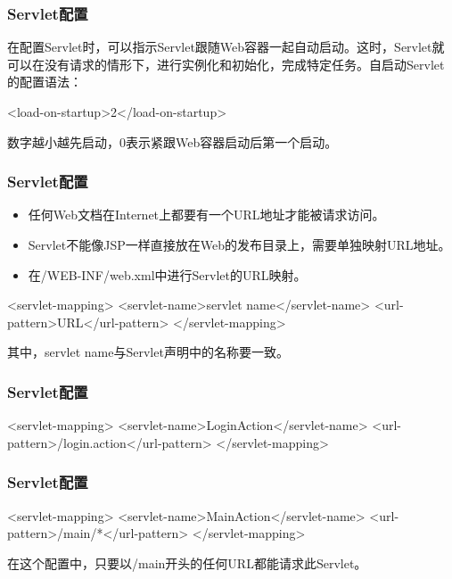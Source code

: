 \begin{frame}[fragile] %
\frametitle{Servlet配置}

在配置Servlet时，可以指示Servlet跟随Web容器一起自动启动。这时，Servlet就可以在没有请求的情形下，进行实例化和初始化，完成特定任务。自启动Servlet的配置语法：

\begin{xmlCode}
<load-on-startup>2</load-on-startup>
\end{xmlCode}

数字越小越先启动，0表示紧跟Web容器启动后第一个启动。
\end{frame}

\begin{frame}[fragile] %
\frametitle{Servlet配置}
\begin{itemize}
\item 任何Web文档在Internet上都要有一个URL地址才能被请求访问。
\item Servlet不能像JSP一样直接放在Web的发布目录上，需要单独映射URL地址。
\item 在{\Red /WEB-INF/web.xml}中进行Servlet的URL映射。
\end{itemize}


\begin{xmlCode}
<servlet-mapping>
  <servlet-name>servlet name</servlet-name>
  <url-pattern>URL</url-pattern>
</servlet-mapping>
\end{xmlCode}
{\kai 其中，servlet name与Servlet声明中的名称要一致。}
\end{frame}

\begin{frame}[fragile] %
\frametitle{Servlet配置}

\begin{xmlCode}
<servlet-mapping>
  <servlet-name>LoginAction</servlet-name>
  <url-pattern>/login.action</url-pattern>
</servlet-mapping>
\end{xmlCode}
\end{frame}

\begin{frame}[fragile] %
\frametitle{Servlet配置}

\begin{xmlCode}
<servlet-mapping>
  <servlet-name>MainAction</servlet-name>
  <url-pattern>/main/*</url-pattern>
</servlet-mapping>
\end{xmlCode}

在这个配置中，只要以/main开头的任何URL都能请求此Servlet。
\end{frame}

